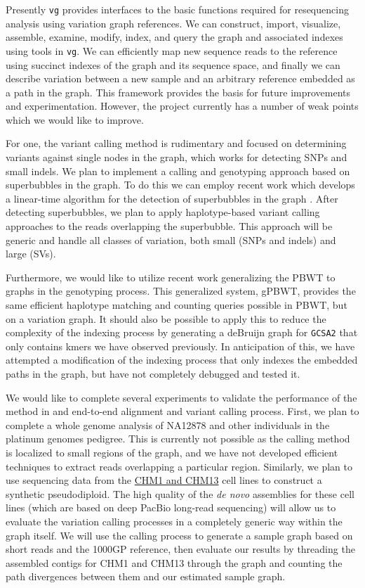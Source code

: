\documentclass{article}
\begin{document}
Presently {\tt vg} provides interfaces to the basic functions required for resequencing analysis using variation graph references.
We can construct, import, visualize, assemble, examine, modify, index, and query the graph and associated indexes using tools in {\tt vg}.
We can efficiently map new sequence reads to the reference using succinct indexes of the graph and its sequence space, and finally we can describe variation between a new sample and an arbitrary reference embedded as a path in the graph.
This framework provides the basis for future improvements and experimentation.
However, the project currently has a number of weak points which we would like to improve.

For one, the variant calling method is rudimentary and focused on determining variants against single nodes in the graph, which works for detecting SNPs and small indels.
We plan to implement a calling and genotyping approach based on superbubbles in the graph.
To do this we can employ recent work which develops a linear-time algorithm for the detection of superbubbles in the graph \cite{brankovic2016linear}.
After detecting superbubbles, we plan to apply haplotype-based variant calling approaches \cite{garrison2012haplotype} to the reads overlapping the superbubble.
This approach will be generic and handle all classes of variation, both small (SNPs and indels) and large (SVs).

Furthermore, we would like to utilize recent work generalizing the PBWT to graphs in the genotyping process.
This generalized system, gPBWT, provides the same efficient haplotype matching and counting queries possible in PBWT, but on a variation graph.
It should also be possible to apply this to reduce the complexity of the indexing process by generating a deBruijn graph for {\tt GCSA2} that only contains kmers we have observed previously.
In anticipation of this, we have attempted a modification of the indexing process that only indexes the embedded paths in the graph, but have not completely debugged and tested it.

We would like to complete several experiments to validate the performance of the method in and end-to-end alignment and variant calling process.
First, we plan to complete a whole genome analysis of NA12878 and other individuals in the platinum genomes pedigree.
This is currently not possible as the calling method is localized to small regions of the graph, and we have not developed efficient techniques to extract reads overlapping a particular region.
Similarly, we plan to use sequencing data from the \href{http://www.ncbi.nlm.nih.gov/assembly/706168/}{CHM1 and CHM13} cell lines to construct a synthetic pseudodiploid.
The high quality of the \emph{de novo} assemblies for these cell lines (which are based on deep PacBio long-read sequencing) will allow us to evaluate the variation calling processes in a completely generic way within the graph itself.
We will use the calling process to generate a sample graph based on short reads and the 1000GP reference, then evaluate our results by threading the assembled contigs for CHM1 and CHM13 through the graph and counting the path divergences between them and our estimated sample graph.
\end{document}
